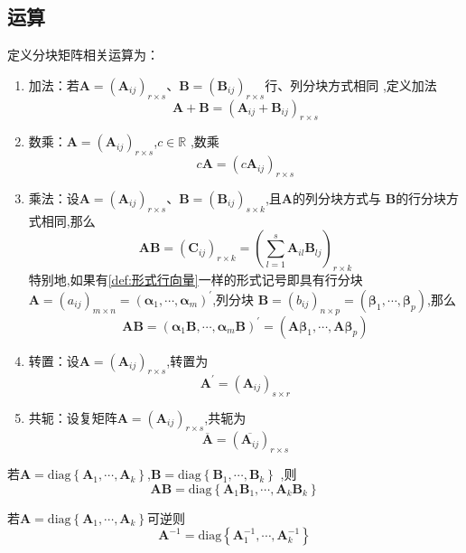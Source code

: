 \subsection{运算}
\begin{formal}
\begin{definition}[运算]\label{def:运算}
定义分块矩阵相关运算为：
\begin{enumerate}[label=\textup{(\arabic*)}]
    \item 加法：若$\bm{A} = \left(\bm{A}_{ij}\right)_{
    r \times s
}$、$\bm{B} = 
\left(\bm{B}_{ij}\right)_{
    r \times s
}$行、列分块方式相同
,定义加法
\[
\bm{A}+\bm{B} = \left(
    \bm{A}_{ij} + \bm{B}_{ij}
\right)_{r \times s}
\]
\item 数乘：$\bm{A} = \left(\bm{A}_{ij}\right)_{
    r \times s
}$,$c \in \mathbb{R} $
,数乘
\[
c\bm{A} = \left(c\bm{A}_{ij}\right)
_{r \times s}
\]
\item 乘法：设$\bm{A} = \left(\bm{A}_{ij}\right)_{
    r \times s
}$、$\bm{B} = 
\left(\bm{B}_{ij}\right)_{
    s \times k
}$,且$\bm{A}$的列分块方式与
$\bm{B}$的行分块方式相同,那么
\[
    \bm{AB} = \left(\bm{C}_{ij}
    \right)_{r \times k} 
    = \left(
        \sum_{l = 1}^{s}\bm{A}_{il}
        \bm{B}_{lj}
    \right)_{
        r \times k
    }
\]
特别地,如果有\cref{def:形式行向量}一样的形式记号即具有行分块
$\bm{A} = \left(a_{ij}\right)_{
    m \times n
} = \left(
    \bm{\alpha }_1,\cdots
    ,\bm{\alpha }_m
\right)^{\prime}$,列分块
$\bm{B} = \left(b_{ij}\right)_{
    n \times p
} = \left(
    \bm{\beta  }_1,\cdots
    ,\bm{\beta  }_p
\right)$,那么
\[
\bm{AB} = \left(\bm{\alpha }_1
\bm{B},\cdots,
\bm{\alpha }_m\bm{B}\right)^{\prime} =
\left(
    \bm{A}\bm{\beta }_1,\cdots
    ,\bm{A}\bm{\beta }_p
\right)
\]
\item 转置：设$\bm{A} = \left(\bm{A}_{ij}\right)_{
    r \times s
}$,转置为
\[
\bm{A}^{\prime} = \left(
    \bm{A}_{ij}
\right)_{s \times r}
\]
\item 共轭：设复矩阵$\bm{A} = \left(\bm{A}_{ij}\right)_{
    r \times s
}$,共轭为
\[
\overline{\bm{A}} = 
\left(\overline{\bm{A}_{ij}} \right)
_{r \times s}
\]   
\end{enumerate}
\end{definition}
\end{formal}
\begin{brown}
\begin{example}
    若$\bm{A} = \mathrm{diag}\left\{
        \bm{A}_1,\cdots,\bm{A}_k
    \right\}$,$
    \bm{B}= \mathrm{diag}\left\{
        \bm{B}_1,\cdots,\bm{B}_k
    \right\}$
    ,则
    \[
    \bm{AB} = \mathrm{diag}\left\{
        \bm{A}_1\bm{B}_1,\cdots
        ,\bm{A}_k\bm{B}_k
    \right\}
    \]
\end{example}
\end{brown}\begin{green}
\begin{corollary}[分块矩阵的逆阵]\label{cor:分块矩阵的逆阵}
    若$\bm{A} = \mathrm{diag}\left\{
        \bm{A}_1,\cdots,\bm{A}_k
    \right\}$可逆则
    \[
    \bm{A}^{-1} = 
    \mathrm{diag}\left\{
        \bm{A}_1^{-1},\cdots
        ,\bm{A}_k^{-1}
    \right\}
    \]
\end{corollary}
\end{green}
